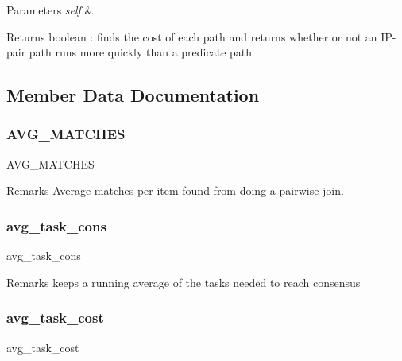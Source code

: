 \begin{DoxyParams}{Parameters}
{\em self} & \\
\hline
\end{DoxyParams}
\begin{DoxyReturn}{Returns}
boolean \+: finds the cost of each path and returns whether or not an I\+P-\/pair path runs more quickly than a predicate path 
\end{DoxyReturn}


\subsection{Member Data Documentation}
\mbox{\label{classdynamicfilterapp_1_1models_1_1_join_a42fd69e46cbed84fb4eb077014ab26c0}} 
\subsubsection{\texorpdfstring{AVG\_MATCHES}{AVG\_MATCHES}}
{\footnotesize\ttfamily A\+V\+G\+\_\+\+M\+A\+T\+C\+H\+ES}

\begin{DoxyRemark}{Remarks}
Average matches per item found from doing a pairwise join. 
\end{DoxyRemark}
\mbox{\label{classdynamicfilterapp_1_1models_1_1_join_a59361dbf99fd8ba09b0b618a50d6c3b8}} 
\subsubsection{\texorpdfstring{avg\_task\_cons}{avg\_task\_cons}}
{\footnotesize\ttfamily avg\+\_\+task\+\_\+cons}

\begin{DoxyRemark}{Remarks}
keeps a running average of the tasks needed to reach consensus 
\end{DoxyRemark}
\mbox{\label{classdynamicfilterapp_1_1models_1_1_join_a70729c52cf346cc8c79b2879f728cb99}} 
\subsubsection{\texorpdfstring{avg\_task\_cost}{avg\_task\_cost}}
{\footnotesize\ttfamily avg\+\_\+task\+\_\+cost}

